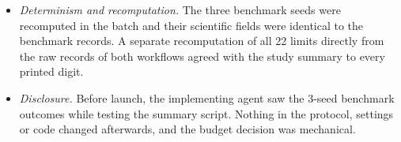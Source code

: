\begin{itemize}
wall); 256 of 256 records completed, with no failure and no seed replacement.
\item \emph{Determinism and recomputation.} The three benchmark seeds were
recomputed in the batch and their scientific fields were identical to the
benchmark records. A separate recomputation of all 22 limits directly from the
raw records of both workflows agreed with the study summary to every printed
digit.
\item \emph{Disclosure.} Before launch, the implementing agent saw the 3-seed
benchmark outcomes while testing the summary script. Nothing in the protocol,
settings or code changed afterwards, and the budget decision was mechanical.
\end{itemize}

